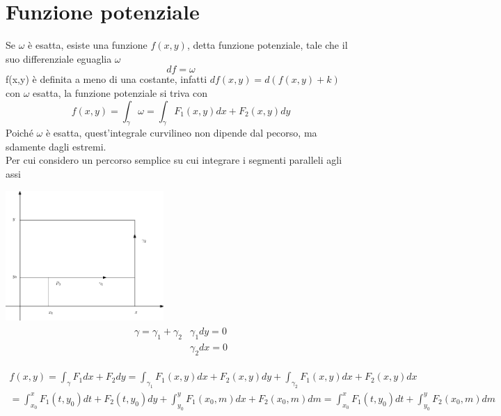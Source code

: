 \section{Funzione potenziale}
\begin{defi}
	Se $\omega$ è esatta, esiste una funzione $f(x,y)$, detta
	{\color{red}funzione potenziale}, tale che il suo differenziale eguaglia
	$\omega$
	\begin{equation*}
		df=\omega
	\end{equation*}
	f(x,y) è definita a meno di una costante, infatti $df(x,y)= d(f(x,y)+k)$
	con $\omega$ esatta, la funzione potenziale si triva con 
	\begin{equation*}
		f(x,y)=\int_\gamma \omega=\int_\gamma F_1(x,y)dx+F_2(x,y)dy
	\end{equation*}
	Poiché $\omega$ è esatta, quest'integrale curvilineo non dipende dal
	pecorso, ma sdamente dagli estremi. \\
	Per cui considero un percorso semplice su cui integrare i segmenti
	paralleli agli assi
	\begin{multicols}{2}
          \includegraphics[width=6cm]{img/finiti/es-fun-pot.eps}\\
          \begin{eqnarray*}
            \begin{matrix}
              \gamma=\gamma_1+\gamma_2 & \gamma_1 dy=0\\
              			       & \gamma_2 dx=0
            \end{matrix}
          \end{eqnarray*} 
	\end{multicols}
        \begin{eqnarray*}
          f(x,y) = \int_\gamma F_1dx+F_2 dy= \int_{\gamma_1} F_1(x,y)dx+F_2 (x,y)dy+
          \int_{\gamma_2} F_1(x,y)dx+F_2(x,y)dx\\
          =\int_{x_0}^{x}F_1(t,y_0)dt+F_2(t,y_0)dy+\int_{y_0}^yF_1(x_0,m)dx+F_2(x_0,m)dm
          =\int_{x_0}^{x}F_1(t,y_0)dt+\int_{y_0}^yF_2(x_0,m)dm
        \end{eqnarray*}        
\end{defi}
\clearpage
